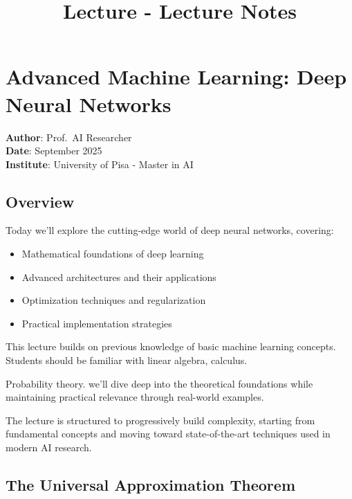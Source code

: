 \documentclass[
]{article}
\title{Lecture - Lecture Notes}
\author{}
\date{}
\providecommand{\tightlist}{%
  \setlength{\itemsep}{0pt}\setlength{\parskip}{0pt}}
\renewcommand*\contentsname{Table of contents}
\newcommand\contentsname{Table of contents}
\begin{document}
\maketitle

\renewcommand*\contentsname{Table of contents}
{
\hypersetup{linkcolor=}
\setcounter{tocdepth}{3}
\tableofcontents
}

\section{Advanced Machine Learning: Deep Neural
Networks}\label{advanced-machine-learning-deep-neural-networks}

\textbf{Author}: Prof.~AI Researcher\\
\textbf{Date}: September 2025\\
\textbf{Institute}: University of Pisa - Master in AI

\subsection{Overview}\label{overview}

Today we'll explore the cutting-edge world of deep neural networks,
covering:

\begin{itemize}
\tightlist
\item
  Mathematical foundations of deep learning
\item
  Advanced architectures and their applications
\item
  Optimization techniques and regularization
\item
  Practical implementation strategies
\end{itemize}

This lecture builds on previous knowledge of basic machine learning
concepts. Students should be familiar with linear algebra, calculus.

Probability theory. we'll dive deep into the theoretical foundations
while maintaining practical relevance through real-world examples.

The lecture is structured to progressively build complexity, starting
from fundamental concepts and moving toward state-of-the-art techniques
used in modern AI research.

\subsection{The Universal Approximation
Theorem}\label{the-universal-approximation-theorem}
\end{document}
